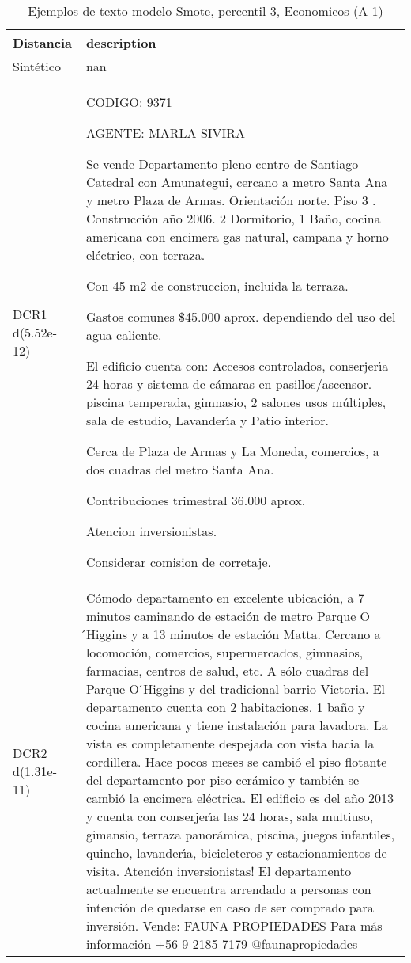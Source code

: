 \begin{table}[H]
\centering
\fontsize{10}{14}\selectfont
\caption{Ejemplos de texto modelo Smote, percentil 3, Economicos (A-1)}
\label{table-example-economicos-a-1-smote-enc-3p-text}
\begin{tabular}{|l|m{35em}|}
\hline
\rowcolor[gray]{0.8}
Distancia & description \\
\hline Sintético & nan \\
\hline DCR1 d(5.52e-12) & CODIGO: 9371

AGENTE: MARLA SIVIRA

Se vende Departamento pleno centro de Santiago Catedral con Amunategui, cercano a metro Santa Ana y metro Plaza de Armas. Orientaci\'on norte. Piso 3 . Construcci\'on a\~no 2006. 2 Dormitorio, 1 Ba\~no, cocina americana con encimera gas natural, campana y horno el\'ectrico, con terraza.

Con 45 m2 de construccion, incluida la terraza.

Gastos comunes \$45.000 aprox. dependiendo del uso del agua caliente.

El edificio cuenta con: Accesos controlados, conserjer{\'\i}a 24 horas y sistema de c\'amaras en pasillos/ascensor. piscina temperada, gimnasio, 2 salones usos m\'ultiples, sala de estudio, Lavander{\'\i}a y Patio interior.

Cerca de Plaza de Armas y La Moneda, comercios, a dos cuadras del metro Santa Ana.

Contribuciones trimestral 36.000 aprox.

Atencion inversionistas.

Considerar comision de corretaje. \\
\hline DCR2 d(1.31e-11) & C\'omodo departamento en excelente ubicaci\'on, a 7 minutos caminando de estaci\'on de metro Parque O ́Higgins y a 13 minutos de estaci\'on Matta. Cercano a locomoci\'on, comercios, supermercados, gimnasios, farmacias, centros de salud, etc. A s\'olo cuadras del Parque O ́Higgins y del tradicional barrio Victoria.  El departamento cuenta con 2 habitaciones, 1 ba\~no y cocina americana y tiene instalaci\'on para lavadora. La vista es completamente despejada con vista hacia la cordillera. Hace pocos meses se cambi\'o el piso flotante del departamento por piso cer\'amico y tambi\'en se cambi\'o la encimera el\'ectrica.  El edificio es del a\~no 2013 y cuenta con conserjer{\'\i}a las 24 horas, sala multiuso, gimansio, terraza panor\'amica, piscina, juegos infantiles, quincho, lavander{\'\i}a, bicicleteros y estacionamientos de visita.   Atenci\'on inversionistas! El departamento actualmente se encuentra arrendado a personas con intenci\'on de quedarse en caso de ser comprado para inversi\'on.  Vende: FAUNA PROPIEDADES Para m\'as informaci\'on +56 9 2185 7179 @faunapropiedades \\
\hline
\end{tabular}
\end{table}
